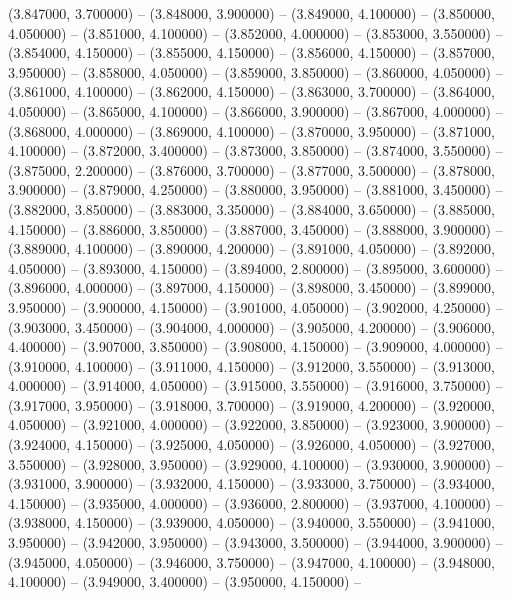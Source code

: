 (3.847000, 3.700000) -- 
(3.848000, 3.900000) -- 
(3.849000, 4.100000) -- 
(3.850000, 4.050000) -- 
(3.851000, 4.100000) -- 
(3.852000, 4.000000) -- 
(3.853000, 3.550000) -- 
(3.854000, 4.150000) -- 
(3.855000, 4.150000) -- 
(3.856000, 4.150000) -- 
(3.857000, 3.950000) -- 
(3.858000, 4.050000) -- 
(3.859000, 3.850000) -- 
(3.860000, 4.050000) -- 
(3.861000, 4.100000) -- 
(3.862000, 4.150000) -- 
(3.863000, 3.700000) -- 
(3.864000, 4.050000) -- 
(3.865000, 4.100000) -- 
(3.866000, 3.900000) -- 
(3.867000, 4.000000) -- 
(3.868000, 4.000000) -- 
(3.869000, 4.100000) -- 
(3.870000, 3.950000) -- 
(3.871000, 4.100000) -- 
(3.872000, 3.400000) -- 
(3.873000, 3.850000) -- 
(3.874000, 3.550000) -- 
(3.875000, 2.200000) -- 
(3.876000, 3.700000) -- 
(3.877000, 3.500000) -- 
(3.878000, 3.900000) -- 
(3.879000, 4.250000) -- 
(3.880000, 3.950000) -- 
(3.881000, 3.450000) -- 
(3.882000, 3.850000) -- 
(3.883000, 3.350000) -- 
(3.884000, 3.650000) -- 
(3.885000, 4.150000) -- 
(3.886000, 3.850000) -- 
(3.887000, 3.450000) -- 
(3.888000, 3.900000) -- 
(3.889000, 4.100000) -- 
(3.890000, 4.200000) -- 
(3.891000, 4.050000) -- 
(3.892000, 4.050000) -- 
(3.893000, 4.150000) -- 
(3.894000, 2.800000) -- 
(3.895000, 3.600000) -- 
(3.896000, 4.000000) -- 
(3.897000, 4.150000) -- 
(3.898000, 3.450000) -- 
(3.899000, 3.950000) -- 
(3.900000, 4.150000) -- 
(3.901000, 4.050000) -- 
(3.902000, 4.250000) -- 
(3.903000, 3.450000) -- 
(3.904000, 4.000000) -- 
(3.905000, 4.200000) -- 
(3.906000, 4.400000) -- 
(3.907000, 3.850000) -- 
(3.908000, 4.150000) -- 
(3.909000, 4.000000) -- 
(3.910000, 4.100000) -- 
(3.911000, 4.150000) -- 
(3.912000, 3.550000) -- 
(3.913000, 4.000000) -- 
(3.914000, 4.050000) -- 
(3.915000, 3.550000) -- 
(3.916000, 3.750000) -- 
(3.917000, 3.950000) -- 
(3.918000, 3.700000) -- 
(3.919000, 4.200000) -- 
(3.920000, 4.050000) -- 
(3.921000, 4.000000) -- 
(3.922000, 3.850000) -- 
(3.923000, 3.900000) -- 
(3.924000, 4.150000) -- 
(3.925000, 4.050000) -- 
(3.926000, 4.050000) -- 
(3.927000, 3.550000) -- 
(3.928000, 3.950000) -- 
(3.929000, 4.100000) -- 
(3.930000, 3.900000) -- 
(3.931000, 3.900000) -- 
(3.932000, 4.150000) -- 
(3.933000, 3.750000) -- 
(3.934000, 4.150000) -- 
(3.935000, 4.000000) -- 
(3.936000, 2.800000) -- 
(3.937000, 4.100000) -- 
(3.938000, 4.150000) -- 
(3.939000, 4.050000) -- 
(3.940000, 3.550000) -- 
(3.941000, 3.950000) -- 
(3.942000, 3.950000) -- 
(3.943000, 3.500000) -- 
(3.944000, 3.900000) -- 
(3.945000, 4.050000) -- 
(3.946000, 3.750000) -- 
(3.947000, 4.100000) -- 
(3.948000, 4.100000) -- 
(3.949000, 3.400000) -- 
(3.950000, 4.150000) -- 
